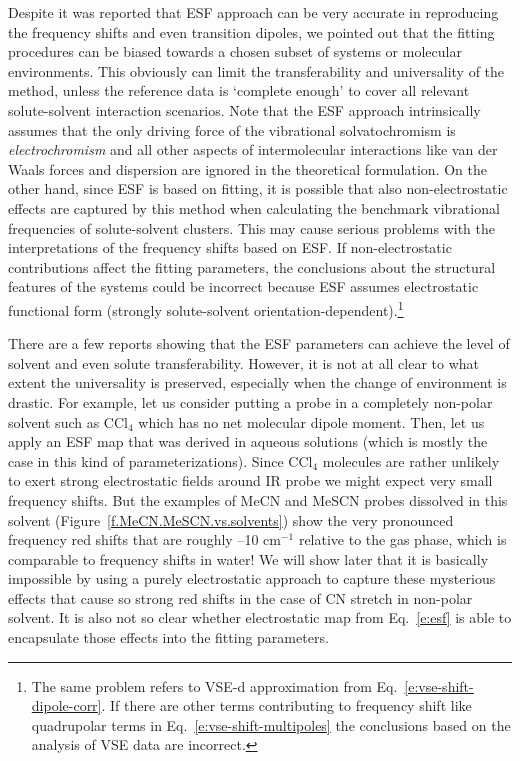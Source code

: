 \documentclass[b5paper,oneside,fleqn,11pt]{book}
\begin{document}
\begin{refsection}
Despite it was reported that ESF approach can be very accurate in reproducing the frequency shifts and even
transition dipoles, we pointed out that the fitting procedures
can be biased towards a chosen subset of systems or molecular environments. This obviously can limit
the transferability and universality of the method, unless the reference data is `complete enough'
to cover all relevant solute\hyp{}solvent interaction scenarios. Note that the ESF approach intrinsically
assumes that the only driving force of the vibrational solvatochromism is \emph{electrochromism}
and all other aspects of intermolecular interactions like van der Waals forces and dispersion are
ignored in the theoretical formulation. On the other hand, since ESF is based on fitting, it is 
possible that also non\hyp{}electrostatic effects are captured by this method when calculating the benchmark 
vibrational frequencies of solute\hyp{}solvent clusters. This may cause serious problems with the interpretations
of the frequency shifts based on ESF. If non\hyp{}electrostatic contributions affect the fitting
parameters, the conclusions about the structural features of the systems could be incorrect 
because ESF assumes electrostatic functional form (strongly solute\hyp{}solvent orientation\hyp{}dependent).\footnote{
The same problem refers to VSE-d approximation from Eq.~\eqref{e:vse-shift-dipole-corr}.
If there are other terms contributing to frequency shift like quadrupolar terms 
in Eq.~\eqref{e:vse-shift-multipoles} the conclusions based
on the analysis of VSE data are incorrect.}

There are a few reports showing that the ESF parameters can achieve the level of solvent
and even solute transferability. \citep{Kwac.Lee.Cho.JCP.2004,
DeCamp.DeFlores.McCracken.Tokmakoff.Kwac.Cho.JPCB.2005,Jansen.Knoester.JCP.2006,
Choi.Raleigh.Cho.JCPL.2011} However, it is not at all clear to what extent the universality is
preserved, especially when the change of environment is drastic. For example, let us consider putting a probe in
a completely non\hyp{}polar solvent such as CCl$_4$ which has no net molecular dipole moment. 
Then, let us apply an ESF map that was derived in aqueous solutions (which is mostly the case in this kind
of parameterizations). Since CCl$_4$ molecules are rather unlikely to exert strong electrostatic fields 
around IR probe we might expect very small frequency shifts. But the examples of MeCN and MeSCN probes
dissolved in this solvent (Figure~\ref{f.MeCN.MeSCN.vs.solvents}) 
show the very pronounced frequency red shifts that are roughly --10 cm$^{-1}$
relative to the gas phase, which is comparable to frequency shifts in water! 
We will show later that it is basically impossible by using a purely electrostatic approach
to capture these mysterious effects that cause so strong red shifts in the case of CN stretch in non\hyp{}polar
solvent. It is also not so clear whether electrostatic map from Eq.~\eqref{e:esf} is able to 
encapsulate those effects into the fitting parameters.


\end{refsection}
\end{document}
